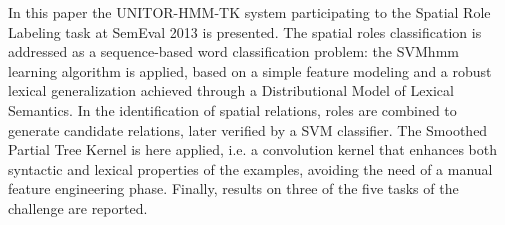 In this paper the UNITOR-HMM-TK system participating to the Spatial Role Labeling task at SemEval 2013 is presented. The spatial roles classification is
 addressed as a sequence-based word classification problem: the SVMhmm learning
 algorithm is applied, based on a simple feature modeling and a robust lexical
 generalization achieved through a Distributional Model of Lexical Semantics. In
 the identification of spatial relations, roles are combined to generate
 candidate relations, later verified by a SVM classifier. The Smoothed Partial
 Tree Kernel is here applied, i.e. a convolution kernel that enhances both
 syntactic and lexical properties of the examples, avoiding the need of a manual
 feature engineering phase. Finally, results on three of the five tasks of the
 challenge are reported.


